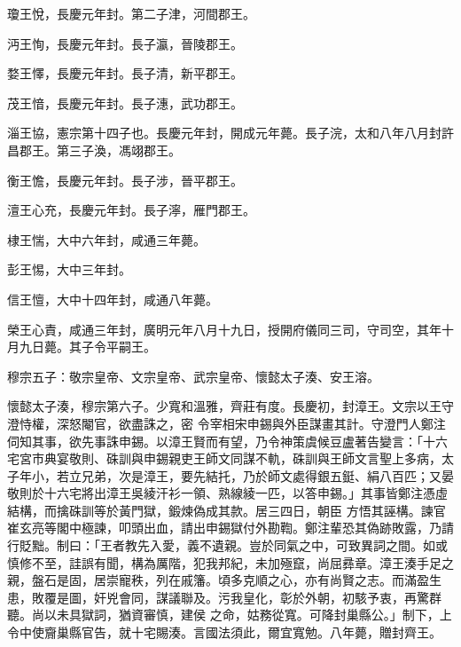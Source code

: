 \begin{pinyinscope}
 瓊王悅，長慶元年封。第二子津，河間郡王。



 沔王恂，長慶元年封。長子瀛，晉陵郡王。



 婺王懌，長慶元年封。長子清，新平郡王。



 茂王愔，長慶元年封。長子潓，武功郡王。



 淄王協，憲宗第十四子也。長慶元年封，開成元年薨。長子浣，太和八年八月封許昌郡王。第三子渙，馮翊郡王。



 衡王憺，長慶元年封。長子涉，晉平郡王。



 澶王心充，長慶元年封。長子濘，雁門郡王。



 棣王惴，大中六年封，咸通三年薨。



 彭王惕，大中三年封。



 信王憻，大中十四年封，咸通八年薨。



 榮王心責，咸通三年封，廣明元年八月十九日，授開府儀同三司，守司空，其年十月九日薨。其子令平嗣王。



 穆宗五子：敬宗皇帝、文宗皇帝、武宗皇帝、懷懿太子湊、安王溶。



 懷懿太子湊，穆宗第六子。少寬和溫雅，齊莊有度。長慶初，封漳王。文宗以王守澄恃權，深怒閹官，欲盡誅之，密
 令宰相宋申錫與外臣謀畫其計。守澄門人鄭注伺知其事，欲先事誅申錫。以漳王賢而有望，乃令神策虞候豆盧著告變言：「十六宅宮市典宴敬則、硃訓與申錫親吏王師文同謀不軌，硃訓與王師文言聖上多病，太子年小，若立兄弟，次是漳王，要先結托，乃於師文處得銀五鋌、絹八百匹；又晏敬則於十六宅將出漳王吳綾汗衫一領、熟線綾一匹，以答申錫。」其事皆鄭注憑虛結構，而擒硃訓等於黃門獄，鍛煉偽成其款。居三四日，朝臣
 方悟其誣構。諫官崔玄亮等閣中極諫，叩頭出血，請出申錫獄付外勘鞫。鄭注輩恐其偽跡敗露，乃請行貶黜。制曰：「王者教先入愛，義不遺親。豈於同氣之中，可致異詞之間。如或慎修不至，詿誤有聞，構為厲階，犯我邦紀，未加殛竄，尚屈彞章。漳王湊手足之親，盤石是固，居崇寵秩，列在戚籓。頃多克順之心，亦有尚賢之志。而滿盈生患，敗覆是圖，奸兇會同，謀議聯及。污我皇化，彰於外朝，初駭予衷，再驚群聽。尚以未具獄詞，猶資審慎，建侯
 之命，姑務從寬。可降封巢縣公。」制下，上令中使齎巢縣官告，就十宅賜湊。言國法須此，爾宜寬勉。八年薨，贈封齊王。




\end{pinyinscope}
